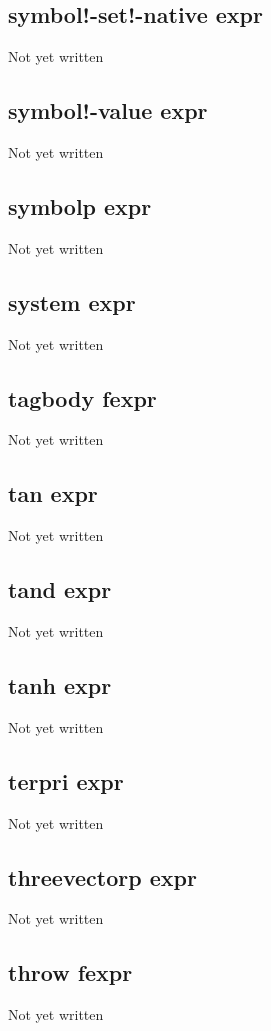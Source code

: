 \documentclass[a4paper,11pt]{article}
\begin{document}
{\subsection{\ttfamily symbol!-set!-native expr}
Not yet written

\subsection{\ttfamily symbol!-value expr}
Not yet written

\subsection{\ttfamily symbolp expr}
Not yet written

\subsection{\ttfamily system expr}
Not yet written

\subsection{\ttfamily tagbody fexpr}
Not yet written

\subsection{\ttfamily tan expr}
Not yet written

\subsection{\ttfamily tand expr}
Not yet written

\subsection{\ttfamily tanh expr}
Not yet written

\subsection{\ttfamily terpri expr}
Not yet written

\subsection{\ttfamily threevectorp expr}
Not yet written

\subsection{\ttfamily throw fexpr}
Not yet written

}
\end{document}
